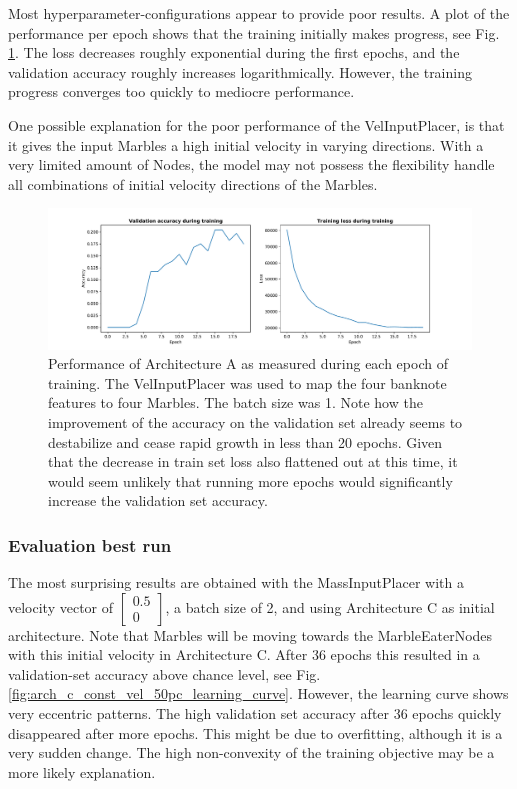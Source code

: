 Most hyperparameter-configurations appear to provide poor results. 
A plot of the performance per epoch shows that the training initially makes progress, 
see Fig. \ref{fig:velinputplacer_performance}. 
The loss decreases roughly exponential during the first epochs, and the validation accuracy roughly increases logarithmically. 
However, the training progress converges too quickly to mediocre performance. 

One possible explanation for the poor performance of the VelInputPlacer, 
is that it gives the input Marbles a high initial velocity in varying directions. 
With a very limited amount of Nodes,
the model may not possess the flexibility handle all combinations of initial velocity directions of the Marbles. 

\begin{figure}[hb]
	\centering
	\includegraphics[scale=0.4]{figures/A_batch1_velinputplacer.pdf}
	\caption{Performance of Architecture A as measured during each epoch of training. The VelInputPlacer was used to map the four banknote features to four Marbles. The batch size was 1. Note how the improvement of the accuracy on the validation set already seems to destabilize and cease rapid growth in less than 20 epochs. Given that the decrease in train set loss also flattened out at this time, it would seem unlikely that running more epochs would significantly increase the validation set accuracy.}
	\label{fig:velinputplacer_performance}
\end{figure}

\clearpage

\subsubsection{Evaluation best run}
The most surprising results are obtained with the MassInputPlacer with a velocity vector of $\begin{bmatrix} 0.5\\0\end{bmatrix}$, 
a batch size of 2, and using Architecture C as initial architecture. 
Note that Marbles will be moving towards the MarbleEaterNodes with this initial velocity in Architecture C. 
After 36 epochs this resulted in a validation-set accuracy above chance level, see Fig. \ref{fig:arch_c_const_vel_50pc_learning_curve}. 
However, the learning curve shows very eccentric patterns. 
The high validation set accuracy after 36 epochs quickly disappeared after more epochs. 
This might be due to overfitting, although it is a very sudden change. 
The high non-convexity of the training objective may be a more likely explanation. 


